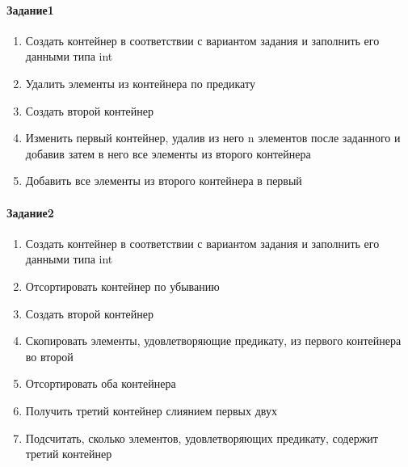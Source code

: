 \paragraph{Задание1}
\begin{enumerate}
    \item Создать контейнер в соответствии с вариантом задания и заполнить его данными типа int
    \item Удалить элементы из контейнера по предикату
    \item Создать второй контейнер
    \item Изменить первый контейнер, удалив из него n элементов после заданного и добавив затем в него все элементы из второго контейнера
    \item Добавить все элементы из второго контейнера в первый
\end{enumerate}

\paragraph{Задание2}
\begin{enumerate}
    \item Создать контейнер в соответствии с вариантом задания и заполнить его данными типа int
    \item Отсортировать контейнер по убыванию
    \item Создать второй контейнер
    \item Скопировать элементы, удовлетворяющие предикату, из первого контейнера во второй
    \item Отсортировать оба контейнера
    \item Получить третий контейнер слиянием первых двух
    \item Подсчитать, сколько элементов, удовлетворяющих предикату, содержит третий контейнер
\end{enumerate}



